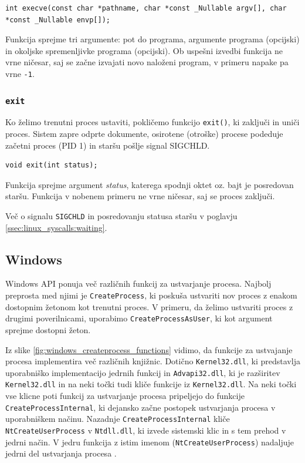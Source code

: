 \documentclass[a4paper,12pt,openright]{book}
\begin{document}
\begin{lstlisting}[style=func]
 int execve(const char *pathname, char *const _Nullable argv[], char *const _Nullable envp[]);
\end{lstlisting}

Funkcija sprejme tri argumente: pot do programa, argumente programa (opcijski) in okoljske spremenljivke programa (opcijski).
Ob uspešni izvedbi funkcija ne vrne ničesar, saj se začne izvajati novo naloženi program, v primeru napake pa vrne \texttt{-1}.

\subsubsection{\texttt{exit}}

Ko želimo trenutni proces ustaviti, pokličemo funkcijo \texttt{exit()}, ki zaključi in uniči proces.
Sistem zapre odprte dokumente, osirotene (otroške) procese podeduje začetni proces (PID 1) in staršu pošlje signal SIGCHLD.

\begin{lstlisting}[style=func]
 void exit(int status);
\end{lstlisting}

Funkcija sprejme argument \textit{status}, katerega spodnji oktet oz. bajt je posredovan staršu.
Funkcija v nobenem primeru ne vrne ničesar, saj se proces zaključi.

Več o signalu \texttt{SIGCHLD} in posredovanju statusa staršu v poglavju \ref{ssec:linux_syscalls:waiting}.

\subsection{Windows}


Windows API ponuja več različnih funkcij za ustvarjanje procesa.
Najbolj preprosta med njimi je \texttt{CreateProcess}, ki poskuša ustvariti nov proces z enakom dostopnim žetonom kot trenutni proces.
V primeru, da želimo ustvariti proces z drugimi poverilnicami, uporabimo \texttt{CreateProcessAsUser}, ki kot argument sprejme dostopni žeton.

Iz slike \ref{fig:windows_createprocess_functions} vidimo, da funkcije za ustvajanje procesa implementira več različnih knjižnic.
Dotično \texttt{Kernel32.dll}, ki predstavlja uporabniško implementacijo jedrnih funkcij in \texttt{Advapi32.dll}, ki je razširitev \texttt{Kernel32.dll} in na neki točki tudi kliče funkcije iz \texttt{Kernel32.dll}.
Na neki točki vse klicne poti funkcij za ustvarjanje procesa pripeljejo do funkcije \texttt{CreateProcessInternal}, ki dejansko začne postopek ustvarjanja procesa v uporabniškem načinu.
Nazadnje \texttt{CreateProcessInternal} kliče \texttt{NtCreateUserProcess} v \texttt{Ntdll.dll}, ki izvede sistemski klic in s tem prehod v jedrni način.
V jedru funkcija z istim imenom (\texttt{NtCreateUserProcess}) nadaljuje jedrni del ustvarjanja procesa \cite{Yosifovich_Russinovich_Solomon_Ionescu_2017}.
\end{document}
